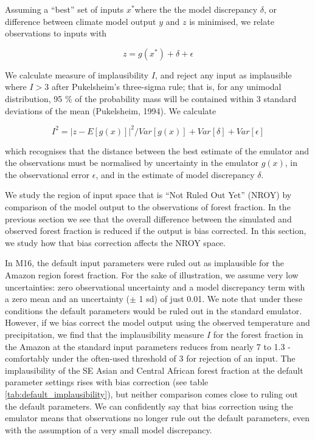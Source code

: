 \documentclass[gmd, manuscript]{copernicus}
\begin{document}
Assuming a ``best'' set of inputs $x^*$where the the model discrepancy $\delta$, or difference between climate model output $y$ and $z$ is minimised, we relate observations to inputs with 

\begin{equation}
z = g(x^*) + \delta + \epsilon 
\end{equation}

We calculate measure of implausibility $I$, and reject any input as implausible where $I >3$ after Pukelsheim's three-sigma rule; that is, for any unimodal distribution, 95 \% of the probability mass will be contained within 3 standard deviations of the mean (Pukelsheim, 1994). We calculate

\begin{equation}
I^{2} = {\lvert  z - E[g(x)]\rvert}^{2} /  Var[g(x)] + Var[\delta] +  Var[\epsilon]
\end{equation}

which recognises that the distance between the best estimate of the emulator and the observations must be normalised by uncertainty in the emulator $g(x)$, in the observational error $\epsilon$, and in the estimate of model discrepancy $\delta$. 

We study the region of input space that is ``Not Ruled Out Yet'' (NROY) by comparison of the model output to the observations of forest fraction. In the previous section we see that the overall difference between the simulated and observed forest fraction is reduced if the output is bias corrected. In this section, we study how that bias correction affects the NROY space.

In M16, the default input parameters were ruled out as implausible for the Amazon region forest fraction. For the sake of illustration, we assume very low uncertainties: zero observational uncertainty and a model discrepancy term with a zero mean and an uncertainty ($\pm$ 1 sd) of just 0.01. We note that under these conditions the default parameters would be ruled out in the standard emulator.  However, if we bias correct the model output using the observed temperature and precipitation, we find that the implausibility measure $I$ for the forest fraction in the Amazon at the standard input parameters reduces from nearly 7 to 1.3 - comfortably under the often-used threshold of 3 for rejection of an input. The implausibility of the SE Asian and Central African forest fraction at the default parameter settings rises with bias correction (see table \ref{tab:default_implausibility}), but neither comparison comes close to ruling out the default parameters. We can confidently say that bias correction using the emulator means that observations no longer rule out the default parameters, even with the assumption of a very small model discrepancy.
\end{document}
